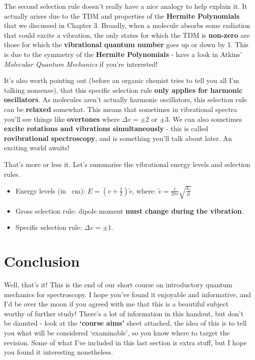 \documentclass{memoir}[11pt,oneside,a4paper,openany]
\newenvironment{myexampleblock}[1]{%
    \tcolorbox[beamer,%
    noparskip,breakable,
    colback=LightGreen,colframe=DarkGreen,%
    colbacklower=LimeGreen!75!LightGreen,%
    title=#1]}%
    {\endtcolorbox}
\begin{document}
The second selection rule doesn't really have a nice analogy to help explain it. It actually arises due to the TDM and properties of the \textbf{Hermite Polynomials} that we discussed in Chapter 3. Broadly, when a molecule absorbs some radiation that could excite a vibration, the only states for which the TDM is \textbf{non-zero} are those for which the \textbf{vibrational quantum number} goes up or down by 1. This is due to the symmetry of the \textbf{Hermite Polynomials} - have a look in Atkins' \emph{Molecular Quantum Mechanics} if you're interested! 

It's also worth pointing out (before an organic chemist tries to tell you all I'm talking nonsense), that this specific selection rule \textbf{only applies for harmonic oscillators}. As molecules aren't actually harmonic oscillators, this selection rule can be \textbf{relaxed} somewhat. This means that sometimes in vibrational spectra you'll see things like \textbf{overtones} where $\Delta v = \pm 2$ or $\pm 3$. We can also sometimes \textbf{excite rotations and vibrations simultaneously} - this is called \textbf{rovibrational spectroscopy}, and is something you'll talk about later. An exciting world awaits!

That's more or less it. Let's summarise the vibrational energy levels and selection rules.
\begin{myexampleblock}{\begin{center}Vibrational Spectroscopy\end{center}}
	\begin{center}
		\begin{itemize}
			\item Energy levels (in \si{\per\centi\metre}): $E = (v+\frac{1}{2})\tilde{v}$, where: $\tilde{v} = \frac{1}{2\pi c}\sqrt{\frac{k_f}{\mu}}$
			\item Gross selection rule: dipole moment \textbf{must change during the vibration}.
			\item Specific selection rule: $\Delta v = \pm 1$.
		\end{itemize}
		\end{center}
\end{myexampleblock}

\section{Conclusion}
Well, that's it! This is the end of our short course on introductory quantum mechanics for spectroscopy. I hope you've found it enjoyable and informative, and I'd be over the moon if you agreed with me that this is a beautiful subject worthy of further study! There's a lot of information in this handout, but don't be daunted - look at the \textbf{`course aims'} sheet attached, the idea of this is to tell you what will be considered `examinable', so you know where to target the revision. Some of what I've included in this last section is extra stuff, but I hope you found it interesting nonetheless.
\end{document}
